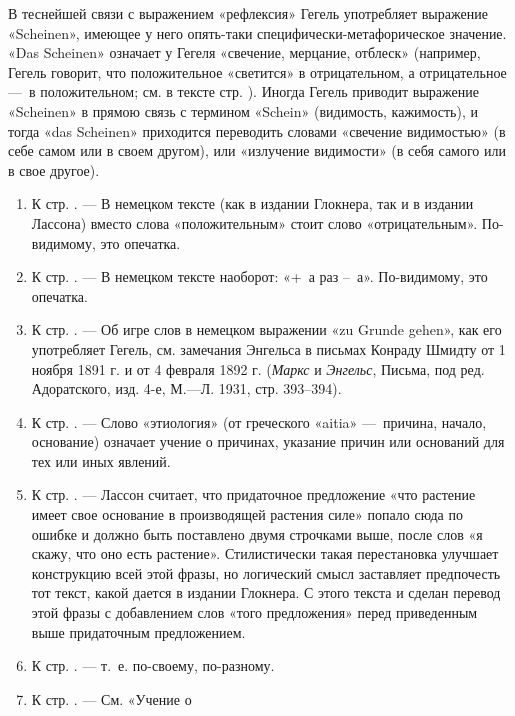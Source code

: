 В теснейшей связи с выражением «рефлексия» Гегель употребляет выражение
«Scheinen», имеющее у него опять-таки специфически-метафорическое значение.
«Das Scheinen» означает у Гегеля «свечение, мерцание, отблеск» (например,
Гегель говорит, что положительное «светится» в отрицательном, а
отрицательное —~в положительном; см. в тексте стр. \pageref{bkm:bm78a}).
Иногда Гегель приводит выражение «Scheinen» в прямою связь с термином
«Schein» (видимость, кажимость), и тогда «das Scheinen» приходится
переводить словами «свечение видимостью» (в себе самом или в своем другом),
или «излучение видимости» (в себя самого или в свое другое).

\begin{enumerate}
\item \label{bkm:Ref474666865}К стр. \pageref{bkm:bm79}. — В немецком тексте
(как в издании Глокнера, так и в издании Лассона) вместо слова
«положительным» стоит слово «отрицательным». По-видимому, это опечатка.
\item \label{bkm:Ref474666880}К стр. \pageref{bkm:bm80}. — В немецком тексте
наоборот: «+~а раз –~а». По-видимому, это опечатка.
\item \label{bkm:Ref474666891}К стр. \pageref{bkm:bm81}. — Об игре слов в
немецком выражении «zu Grunde gehen», как его употребляет Гегель, см.
замечания Энгельса в письмах Конраду Шмидту от 1 ноября 1891 г. и от 4
февраля 1892 г. ({\em Маркс} и {\em Энгельс}, Письма, под ред.
Адоратского, изд. 4-е, М.—Л. 1931, стр. 393–394).
\item \label{bkm:Ref474666904}К стр. \pageref{bkm:bm82}. — Слово «этиология»
(от греческого «aitia» —~причина, начало, основание) означает учение о
причинах, указание причин или оснований для тех или иных явлений.
\item \label{bkm:Ref474666911}К стр. \pageref{bkm:bm83}. — Лассон считает,
что придаточное предложение «что растение имеет свое основание в
производящей растения силе» попало сюда по ошибке и должно быть поставлено
двумя строчками выше, после слов «я скажу, что оно есть растение».
Стилистически такая перестановка улучшает конструкцию всей этой фразы, но
логический смысл заставляет предпочесть тот текст, какой дается в издании
Глокнера. С этого текста и сделан перевод этой фразы с добавлением слов
«того предложения» перед приведенным выше придаточным предложением.
\item \label{bkm:Ref474666923}К стр. \pageref{bkm:bm84}. — т.~е. по-своему,
по-разному.
\item \label{bkm:Ref474666940}К стр. \pageref{bkm:bm85}. — См. «Учение о

\end{enumerate}
